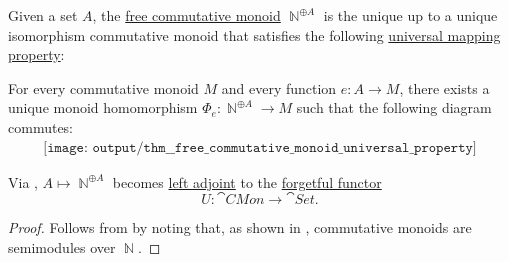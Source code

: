 \begin{theorem}\label{thm:free_commutative_monoid_universal_property}
  Given a set \( A \), the \hyperref[def:free_commutative_monoid]{free commutative monoid} \( \BbbN^{\oplus A} \) is the unique up to a unique isomorphism commutative monoid that satisfies the following \hyperref[rem:universal_mapping_property]{universal mapping property}:
  \begin{displayquote}
    For every commutative monoid \( M \) and every function \( e: A \to M \), there exists a unique monoid homomorphism \( \Phi_e: \BbbN^{\oplus A} \to M \) such that the following diagram commutes:
    \begin{equation}\label{eq:thm:free_semimodule_universal_property/diagram}
      \begin{aligned}
        \texttt{[image: output/thm\_\_free\_commutative\_monoid\_universal\_property]}
      \end{aligned}
    \end{equation}
  \end{displayquote}
\end{theorem}
\begin{comments}
  \item Via , \( A \mapsto \BbbN^{\oplus A} \) becomes \hyperref[def:category_adjunction]{left adjoint} to the \hyperref[def:concrete_category]{forgetful functor}
  \begin{equation*}
    U: \cat{CMon} \to \cat{Set}.
  \end{equation*}
\end{comments}
\begin{proof}
  Follows from  by noting that, as shown in , commutative monoids are semimodules over \( \BbbN \).
\end{proof}
